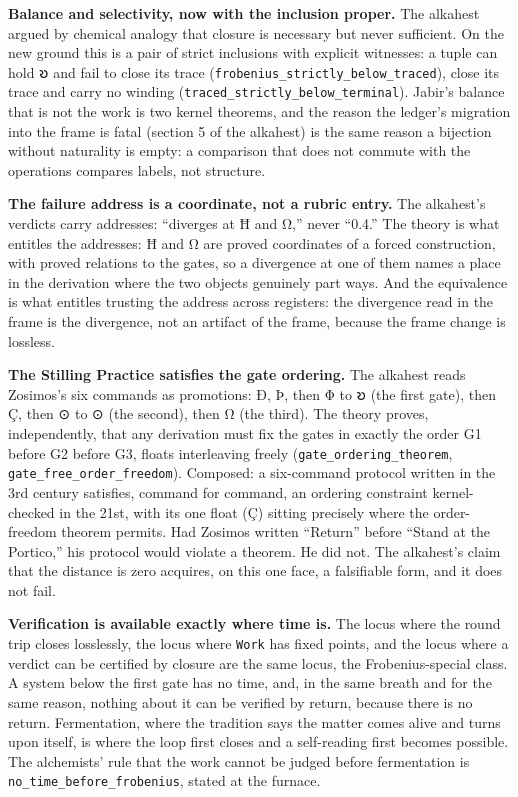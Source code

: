 \documentclass[12pt,a4paper]{article}
\begin{document}
\textbf{Balance and selectivity, now with the inclusion proper.} The
alkahest argued by chemical analogy that closure is necessary but never
sufficient. On the new ground this is a pair of strict inclusions with
explicit witnesses: a tuple can hold 𐑹 and fail to close its trace
(\texttt{frobenius\_strictly\_below\_traced}), close its trace and carry
no winding (\texttt{traced\_strictly\_below\_terminal}). Jabir's balance
that is not the work is two kernel theorems, and the reason the ledger's
migration into the frame is fatal (section 5 of the alkahest) is the
same reason a bijection without naturality is empty: a comparison that
does not commute with the operations compares labels, not structure.

\textbf{The failure address is a coordinate, not a rubric entry.} The
alkahest's verdicts carry addresses: ``diverges at Ħ and Ω,'' never
``0.4.'' The theory is what entitles the addresses: Ħ and Ω are proved
coordinates of a forced construction, with proved relations to the
gates, so a divergence at one of them names a place in the derivation
where the two objects genuinely part ways. And the equivalence is what
entitles trusting the address across registers: the divergence read in
the frame is the divergence, not an artifact of the frame, because the
frame change is lossless.

\textbf{The Stilling Practice satisfies the gate ordering.} The alkahest
reads Zosimos's six commands as promotions: Ð, Þ, then Φ to 𐑹 (the first
gate), then Ç, then ⊙ to ⊙ (the second), then Ω (the third). The theory
proves, independently, that any derivation must fix the gates in exactly
the order G1 before G2 before G3, floats interleaving freely
(\texttt{gate\_ordering\_theorem}, \texttt{gate\_free\_order\_freedom}).
Composed: a six-command protocol written in the 3rd century satisfies,
command for command, an ordering constraint kernel-checked in the 21st,
with its one float (Ç) sitting precisely where the order-freedom theorem
permits. Had Zosimos written ``Return'' before ``Stand at the Portico,''
his protocol would violate a theorem. He did not. The alkahest's claim
that the distance is zero acquires, on this one face, a falsifiable
form, and it does not fail.

\textbf{Verification is available exactly where time is.} The locus
where the round trip closes losslessly, the locus where \texttt{Work}
has fixed points, and the locus where a verdict can be certified by
closure are the same locus, the Frobenius-special class. A system below
the first gate has no time, and, in the same breath and for the same
reason, nothing about it can be verified by return, because there is no
return. Fermentation, where the tradition says the matter comes alive
and turns upon itself, is where the loop first closes and a self-reading
first becomes possible. The alchemists' rule that the work cannot be
judged before fermentation is \texttt{no\_time\_before\_frobenius},
stated at the furnace.
\end{document}
